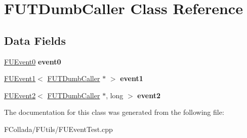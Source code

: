 \hypertarget{classFUTDumbCaller}{
\section{FUTDumbCaller Class Reference}
\label{classFUTDumbCaller}
}
\subsection*{Data Fields}
\begin{DoxyCompactItemize}
\item 
\hypertarget{classFUTDumbCaller_a2b37db6f105db968a258eceb1f4e57ab}{
\hyperlink{classFUEvent0}{FUEvent0} {\bfseries event0}}
\label{classFUTDumbCaller_a2b37db6f105db968a258eceb1f4e57ab}

\item 
\hypertarget{classFUTDumbCaller_a9f55b46ec5faddfcd335688e0da216bb}{
\hyperlink{classFUEvent1}{FUEvent1}$<$ \hyperlink{classFUTDumbCaller}{FUTDumbCaller} $\ast$ $>$ {\bfseries event1}}
\label{classFUTDumbCaller_a9f55b46ec5faddfcd335688e0da216bb}

\item 
\hypertarget{classFUTDumbCaller_a1d9a6172969271fb610ac729fe5f8244}{
\hyperlink{classFUEvent2}{FUEvent2}$<$ \hyperlink{classFUTDumbCaller}{FUTDumbCaller} $\ast$, long $>$ {\bfseries event2}}
\label{classFUTDumbCaller_a1d9a6172969271fb610ac729fe5f8244}

\end{DoxyCompactItemize}


The documentation for this class was generated from the following file:\begin{DoxyCompactItemize}
\item 
FCollada/FUtils/FUEventTest.cpp\end{DoxyCompactItemize}
